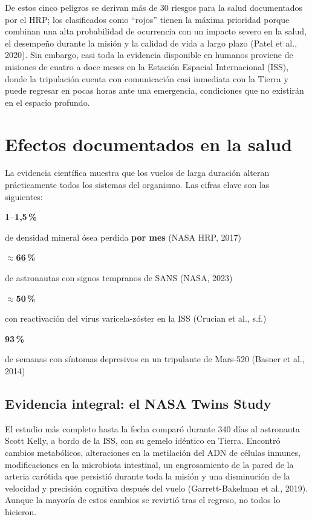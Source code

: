 \documentclass[11pt,a4paper]{article}
\newcommand{\statcard}[3]{%
  \begin{tcolorbox}[enhanced, width=\linewidth, colback=white, colframe=rule, boxrule=0.6pt,
    arc=3pt, left=8pt, right=8pt, top=7pt, bottom=7pt, height=3.15cm, valign=top]
    {\display\bfseries\fontsize{24}{26}\selectfont\color{#1}#2}\par\vspace{3pt}
    {\sffamily\footnotesize\raggedright\color{ink}#3\par}
  \end{tcolorbox}}
\begin{document}
De estos cinco peligros se derivan más de 30 riesgos para la salud documentados por el HRP; los clasificados como \enquote{rojos} tienen la máxima prioridad porque combinan una alta probabilidad de ocurrencia con un impacto severo en la salud, el desempeño durante la misión y la calidad de vida a largo plazo (Patel et al., 2020). Sin embargo, casi toda la evidencia disponible en humanos proviene de misiones de cuatro a doce meses en la Estación Espacial Internacional (ISS), donde la tripulación cuenta con comunicación casi inmediata con la Tierra y puede regresar en pocas horas ante una emergencia, condiciones que no existirán en el espacio profundo.

\section{Efectos documentados en la salud}

La evidencia científica muestra que los vuelos de larga duración alteran prácticamente todos los sistemas del organismo. Las cifras clave son las siguientes:

\vspace{0.3em}
\noindent
\begin{minipage}[t]{0.235\linewidth}\statcard{mars}{1–1,5\,\%}{de densidad mineral ósea perdida \textbf{por mes} (NASA HRP, 2017)}\end{minipage}\hfill
\begin{minipage}[t]{0.235\linewidth}\statcard{mars}{$\approx$66\,\%}{de astronautas con signos tempranos de SANS (NASA, 2023)}\end{minipage}\hfill
\begin{minipage}[t]{0.235\linewidth}\statcard{teal}{$\approx$50\,\%}{con reactivación del virus varicela-zóster en la ISS (Crucian et al., s.f.)}\end{minipage}\hfill
\begin{minipage}[t]{0.235\linewidth}\statcard{teal}{93\,\%}{de semanas con síntomas depresivos en un tripulante de Mars-520 (Basner et al., 2014)}\end{minipage}

\subsection{Evidencia integral: el NASA Twins Study}
El estudio más completo hasta la fecha comparó durante 340 días al astronauta Scott Kelly, a bordo de la ISS, con su gemelo idéntico en Tierra. Encontró cambios metabólicos, alteraciones en la metilación del ADN de células inmunes, modificaciones en la microbiota intestinal, un engrosamiento de la pared de la arteria carótida que persistió durante toda la misión y una disminución de la velocidad y precisión cognitiva después del vuelo (Garrett-Bakelman et al., 2019). Aunque la mayoría de estos cambios se revirtió tras el regreso, no todos lo hicieron.
\end{document}
